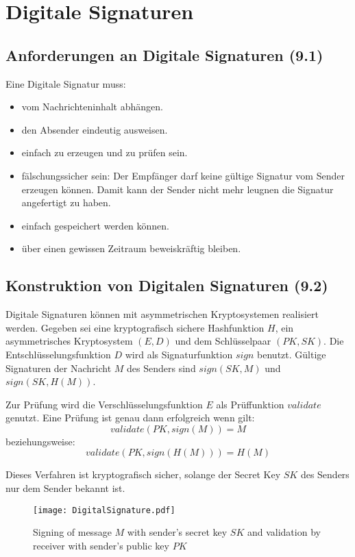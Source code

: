 \chapter{Digitale Signaturen}
\section{Anforderungen an Digitale Signaturen (9.1)}
Eine Digitale Signatur muss:
\begin{itemize}
  \item vom Nachrichteninhalt abhängen.
  \item den Absender eindeutig ausweisen.
  \item einfach zu erzeugen und zu prüfen sein.
  \item fälschungssicher sein: Der Empfänger darf keine gültige Signatur vom Sender erzeugen können. Damit kann der Sender nicht mehr leugnen die Signatur angefertigt zu haben.
  \item einfach gespeichert werden können.
  \item über einen gewissen Zeitraum beweiskräftig bleiben.
\end{itemize}

\section{Konstruktion von Digitalen Signaturen (9.2)}
Digitale Signaturen können mit asymmetrischen Kryptosystemen realisiert werden. Gegeben sei eine kryptografisch sichere Hashfunktion $H$, ein asymmetrisches Kryptosystem $(E,D)$ und dem Schlüsselpaar $(PK,SK)$. Die Entschlüsselungsfunktion $D$ wird als Signaturfunktion $sign$ benutzt. Gültige Signaturen der Nachricht $M$ des Senders sind $sign(SK, M)$ und $sign(SK, H(M))$.

Zur Prüfung wird die Verschlüsselungsfunktion $E$ als Prüffunktion $validate$ genutzt. Eine Prüfung ist genau dann erfolgreich wenn gilt:
$$
	validate(PK, sign(M)) = M
$$
beziehungsweise:
$$
	validate(PK, sign(H(M))) = H(M)
$$

Dieses Verfahren ist kryptografisch sicher, solange der Secret Key $SK$ des Senders nur dem Sender bekannt ist.

\begin{figure}[htp]
	\centering
	\texttt{[image: DigitalSignature.pdf]}
	\caption{Signing of message $M$ with sender's secret key $SK$ and validation by receiver with sender's public key $PK$}
\end{figure}

